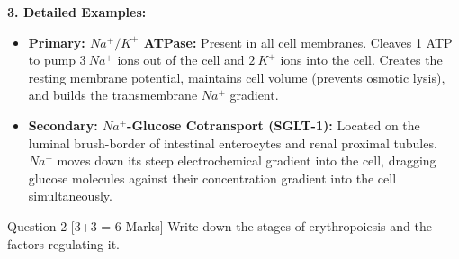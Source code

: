 \documentclass[11pt,a4paper]{article}
\begin{document}
\begin{ansbox}
\textbf{3. Detailed Examples:}
\begin{itemize}[leftmargin=*]
    \item \textbf{Primary: $Na^+/K^+$ ATPase:} Present in all cell membranes. Cleaves 1 ATP to pump $3\ Na^+$ ions out of the cell and $2\ K^+$ ions into the cell. Creates the resting membrane potential, maintains cell volume (prevents osmotic lysis), and builds the transmembrane $Na^+$ gradient.
    \item \textbf{Secondary: $Na^+$-Glucose Cotransport (SGLT-1):} Located on the luminal brush-border of intestinal enterocytes and renal proximal tubules. $Na^+$ moves down its steep electrochemical gradient into the cell, dragging glucose molecules against their concentration gradient into the cell simultaneously.
\end{itemize}
\end{ansbox}

\begin{qbox}{Question 2 [3+3 = 6 Marks]}
Write down the stages of erythropoiesis and the factors regulating it.
\end{qbox}
\end{document}

